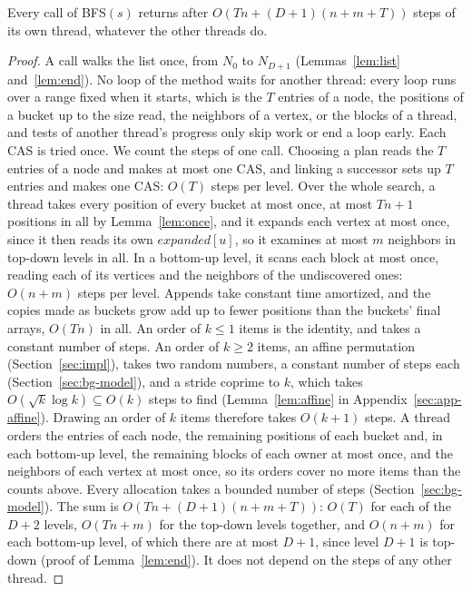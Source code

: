 \begin{theorem}
\label{thm:waitfree}
Every call of \textsc{BFS}$(s)$ returns after $O(Tn + (D+1)(n + m + T))$ steps of its own thread, whatever the other threads do.
\end{theorem}
\begin{proof}
A call walks the list once, from $N_0$ to $N_{D+1}$ (Lemmas~\ref{lem:list} and~\ref{lem:end}). No loop of the method waits for another thread: every loop runs over a range fixed when it starts, which is the $T$ entries of a node, the positions of a bucket up to the size read, the neighbors of a vertex, or the blocks of a thread, and tests of another thread's progress only skip work or end a loop early. Each CAS is tried once. We count the steps of one call. Choosing a plan reads the $T$ entries of a node and makes at most one CAS, and linking a successor sets up $T$ entries and makes one CAS: $O(T)$ steps per level. Over the whole search, a thread takes every position of every bucket at most once, at most $Tn + 1$ positions in all by Lemma~\ref{lem:once}, and it expands each vertex at most once, since it then reads its own $\mathit{expanded}[u]$, so it examines at most $m$ neighbors in top-down levels in all. In a bottom-up level, it scans each block at most once, reading each of its vertices and the neighbors of the undiscovered ones: $O(n + m)$ steps per level. Appends take constant time amortized, and the copies made as buckets grow add up to fewer positions than the buckets' final arrays, $O(Tn)$ in all. An order of $k \leq 1$ items is the identity, and takes a constant number of steps. An order of $k \geq 2$ items, an affine permutation (Section~\ref{sec:impl}), takes two random numbers, a constant number of steps each (Section~\ref{sec:bg-model}), and a stride coprime to $k$, which takes $O(\sqrt{k}\log k) \subseteq O(k)$ steps to find (Lemma~\ref{lem:affine} in Appendix~\ref{sec:app-affine}). Drawing an order of $k$ items therefore takes $O(k + 1)$ steps. A thread orders the entries of each node, the remaining positions of each bucket and, in each bottom-up level, the remaining blocks of each owner at most once, and the neighbors of each vertex at most once, so its orders cover no more items than the counts above. Every allocation takes a bounded number of steps (Section~\ref{sec:bg-model}). The sum is $O(Tn + (D+1)(n + m + T))$: $O(T)$ for each of the $D+2$ levels, $O(Tn + m)$ for the top-down levels together, and $O(n + m)$ for each bottom-up level, of which there are at most $D+1$, since level $D+1$ is top-down (proof of Lemma~\ref{lem:end}). It does not depend on the steps of any other thread.
\end{proof}

